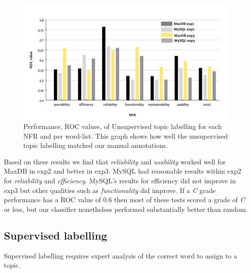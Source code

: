 \documentclass[]{sig-alternate}
\begin{document}
\begin{figure}
  \centering
 \includegraphics[width=\textwidth]{figures/unsupervised-bar}
 \caption{Performance, ROC values, of Unsupervised topic labelling for
   each NFR and per word-list. This graph shows how well the
   unsupervised topic labelling matched our manual annotations.}

  \label{fig:maxdb-unsup-results}
\end{figure}


Based on these results we find that \emph{reliability} and \emph{usability} worked well for MaxDB in \textsf{exp2} and better in \textsf{exp3}. 
MySQL had reasonable results within \textsf{exp2} for \emph{reliability} and \emph{efficiency}. 
MySQL's results for efficiency did not improve in \textsf{exp3} but other qualities such as \emph{functionality} did improve. 
If a \emph{C} grade performance has a ROC value of $0.6$ then most of these tests scored a grade of \emph{C} or less, but our classifier nonetheless performed substantially better than random.


\subsection{Supervised labelling}
\label{sec:suplabelling}
Supervised labelling requires expert analysis of the correct word to assign to a topic. %
\end{document}
